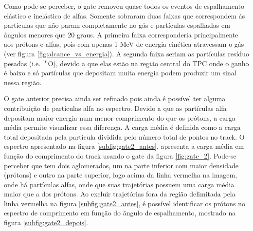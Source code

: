 \documentclass[a4paper,12pt,oneside]{book}
\begin{document}
\par Como pode-se perceber, o gate removeu quase todos os eventos de espalhamento elástico e inelástico de alfas. Somente sobraram duas faixas que correspondem às partículas que não param completamente no gás e partículas espalhadas em ângulos menores que 20 graus. A primeira faixa corresponderia principalmente aos prótons e alfas, pois com apenas 1 MeV de energia cinética atravessam o gás (ver figura \ref{fig:alcance_vs_energia}). A segunda faixa seriam as partículas resíduo pesadas (i.e. $^{16}$O), devido a que elas estão na região central do TPC onde o ganho é baixo e só partículas que depositam muita energia podem produzir um sinal nessa região.

\par O gate anterior precisa ainda ser refinado pois ainda é possível ter alguma contribuição de partículas alfa no espectro. Devido a que as partículas alfa depositam maior energia num menor comprimento do que os prótons, a carga média permite visualizar essa diferença. A carga média é definida como a carga total depositada pela partícula dividida pelo número total de pontos no track. O espectro apresentado na figura \ref{subfig:gate2_antes}, apresenta a carga média em função do comprimento do track usando o gate da figura \ref{fig:gate_2}. Pode-se perceber que tem dois aglomerados, um na parte inferior com maior densidade (prótons) e outro na parte superior, logo acima da linha vermelha na imagem, onde há partículas alfas, onde que suas trajetórias possuem uma carga média maior que a dos prótons. Ao excluir trajetórias fora da região delimitada pela linha vermelha na figura \ref{subfig:gate2_antes}, é possível identificar os prótons no espectro de comprimento em função do ângulo de espalhamento, mostrado na figura \ref{subfig:gate2_depois}.



\end{document}
